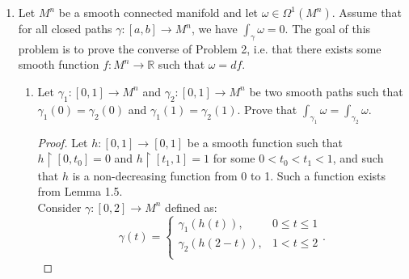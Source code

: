 \documentclass{article}
\begin{document}
\begin{enumerate}[label={\bf Q\arabic*:}]
\begin{enumerate}
      \item Define $M^2_2=\{(x,y)|x>0\}$. Construct an explicit function
        $f:M^2_2\rightarrow\mathbb{R}$ such that $\omega=df$.
        \begin{proof}
          Consider $f((x,y))=\arctan{\frac{y}{x}}$. Then
          \begin{align*}
            df &=\frac{\partial f}{\partial x}dx + \frac{\partial
              f}{\partial y}dy \\
              &=\left(\frac{-y}{x^2+y^2}\right)dx
                +\left(\frac{x}{x^2+y^2}\right)dy \\
              &=\omega. \\
          \end{align*}
        \end{proof}
    \end{enumerate}

  \item Let $M^n$ be a smooth connected manifold and let
    $\omega\in\Omega^1(M^n)$. Assume that for all closed paths
    $\gamma:[a,b]\rightarrow M^n$, we have $\int_\gamma\omega=0$. The goal
    of this problem is to prove the converse of Problem 2, i.e. that there
    exists some smooth function $f:M^n\rightarrow\mathbb{R}$ such that
    $\omega=df$.

    \begin{enumerate}
      \item Let $\gamma_1:[0,1]\rightarrow M^n$ and
        $\gamma_2:[0,1]\rightarrow M^n$ be two smooth paths such that
        $\gamma_1(0)=\gamma_2(0)$ and $\gamma_1(1)=\gamma_2(1)$. Prove that
        $\int_{\gamma_1}\omega=\int_{\gamma_2}\omega$.

        \begin{proof}
          Let $h:[0,1]\rightarrow[0,1]$ be a smooth function such that
          $h\restriction[0,t_0]=0$ and $h\restriction[t_1,1]=1$ for some
          $0<t_0<t_1<1$, and such that $h$ is a non-decreasing function
          from 0 to 1. Such a function exists from Lemma 1.5. \\

          Consider $\gamma:[0,2]\rightarrow M^n$ defined as:
          \begin{equation*}
            \gamma(t) =
            \begin{cases}
              \gamma_1(h(t)), &0\leq t\leq1 \\
              \gamma_2(h(2-t)), &1<t\leq2 \\
            \end{cases}.
          \end{equation*}


\end{proof}
\end{enumerate}
\end{enumerate}
\end{document}
